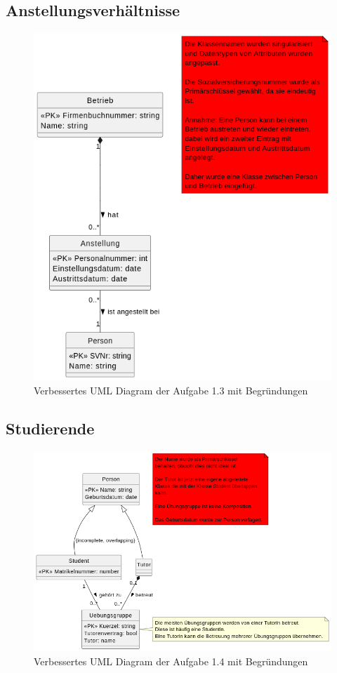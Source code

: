 \documentclass[12pt]{scrartcl}
\begin{document}
\subsection{Anstellungsverhältnisse}
\begin{figure}[h]
    \centering
    \includegraphics[width=0.9\linewidth]{../UE1_1_3.png}
    \caption{Verbessertes UML Diagram der Aufgabe 1.3 mit Begründungen}
\end{figure}
\pagebreak
\subsection{Studierende}
\begin{figure}[h]
    \centering
    \includegraphics[width=0.9\linewidth]{../UE1_1_4.png}
    \caption{Verbessertes UML Diagram der Aufgabe 1.4 mit Begründungen}
\end{figure}
\pagebreak
\end{document}
